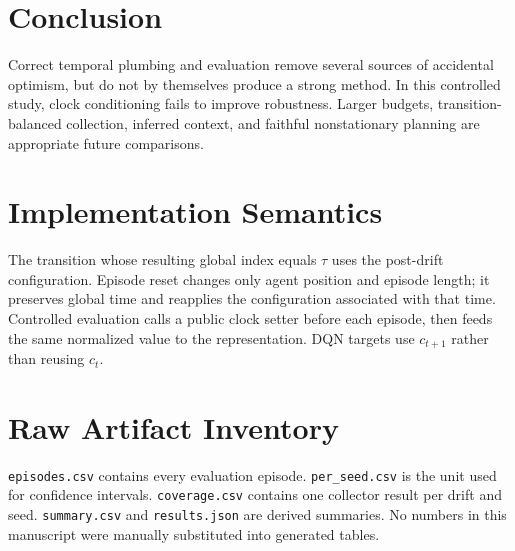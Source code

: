 \documentclass[10pt]{article}
\begin{document}
\section{Conclusion}
Correct temporal plumbing and evaluation remove several sources of accidental
optimism, but do not by themselves produce a strong method.  In this controlled
study, clock conditioning fails to improve robustness.  Larger budgets,
transition-balanced collection, inferred context, and faithful nonstationary
planning are appropriate future comparisons.

\appendix
\section{Implementation Semantics}
The transition whose resulting global index equals $\tau$ uses the post-drift
configuration.  Episode reset changes only agent position and episode length;
it preserves global time and reapplies the configuration associated with that
time.  Controlled evaluation calls a public clock setter before each episode,
then feeds the same normalized value to the representation.  DQN targets use
$c_{t+1}$ rather than reusing $c_t$.

\section{Raw Artifact Inventory}
\texttt{episodes.csv} contains every evaluation episode.
\texttt{per\_seed.csv} is the unit used for confidence intervals.
\texttt{coverage.csv} contains one collector result per drift and seed.
\texttt{summary.csv} and \texttt{results.json} are derived summaries.  No
numbers in this manuscript were manually substituted into generated tables.



\end{document}
